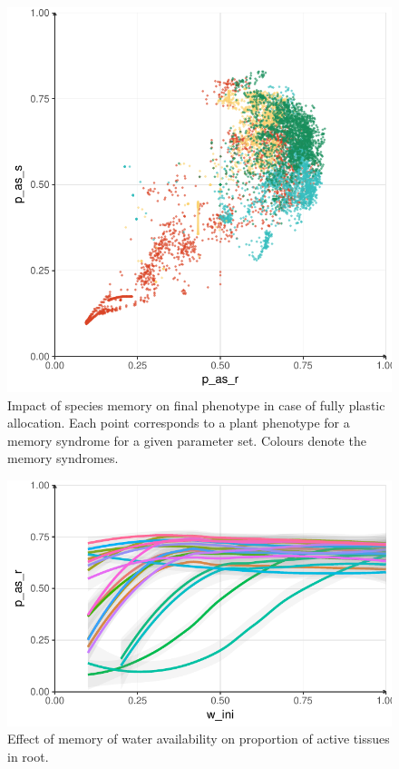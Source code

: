\begin{figure}\label{fig:memory_n_phenotype}
\includegraphics[width = \textwidth]{./2_PP/Figures/par_v_2D_points.pdf}
\caption{Impact of species memory on final phenotype in case of fully plastic allocation. Each point corresponds to a plant phenotype for a memory syndrome for a given parameter set. Colours denote the memory syndromes.}
\end{figure}


\begin{figure}\label{fig:w_ini_p_as_r}
\includegraphics[width = \textwidth]{./2_PP/Figures/w_ini_p_as_r.pdf}
\caption{Effect of memory of water availability on proportion of active tissues in root.}
\end{figure}


